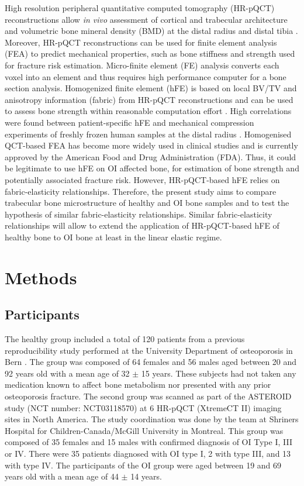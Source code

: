 \documentclass[a4paper,fleqn]{DC_ArtStyle}
\begin{document}
	High resolution peripheral quantitative computed tomography (HR-pQCT) reconstructions allow \textit{in vivo} assessment of cortical and trabecular architecture and volumetric bone mineral density (BMD) at the distal radius and distal tibia \cite{Boutroy2005}. Moreover, HR-pQCT reconstructions can be used for finite element analysis (FEA) to predict mechanical properties, such as bone stiffness and strength \cite{Boutroy2008} used for fracture risk estimation. Micro-finite element (\si{\micro}FE) analysis converts each voxel into an element and thus requires high performance computer for a bone section analysis. Homogenized finite element (hFE) is based on local BV/TV and anisotropy information (fabric) from HR-pQCT reconstructions and can be used to assess bone strength within reasonable computation effort \cite{Pahr2009}. High correlations were found between patient-specific hFE and mechanical compression experiments of freshly frozen human samples at the distal radius \cite{Varga2011,Hosseini2017,AriasMoreno2019}. Homogenised QCT-based FEA has become more widely used in clinical studies \cite{VanDenBergh2021} and is currently approved by the American Food and Drug Administration (FDA). Thus, it could be legitimate to use hFE on OI affected bone, for estimation of bone strength and potentially associated fracture risk. However, HR-pQCT-based hFE relies on fabric-elasticity relationships. Therefore, the present study aims to compare trabecular bone microstructure of healthy and OI bone samples and to test the hypothesis of similar fabric-elasticity relationships. Similar fabric-elasticity relationships will allow to extend the application of HR-pQCT-based hFE of healthy bone to OI bone at least in the linear elastic regime.
	
	
	\section{Methods}
	
	\subsection{Participants}
	The healthy group included a total of 120 patients from a previous reproducibility study performed at the University Department of osteoporosis in Bern \cite{Schenk2020}. The group was composed of 64 females and 56 males aged between 20 and 92 years old with a mean age of 32 $\pm$ 15 years. These subjects had not taken any medication known to affect bone metabolism nor presented with any prior osteoporosis fracture. The second group was scanned as part of the ASTEROID study (NCT number: NCT03118570) at 6 HR-pQCT (XtremeCT II) imaging sites in North America. The study coordination was done by the team at Shriners Hospital for Children-Canada/McGill University in Montreal. This group was composed of 35 females and 15 males with confirmed diagnosis of OI Type I, III or IV. There were 35 patients diagnosed with OI type I, 2 with type III, and 13 with type IV. The participants of the OI group were aged between 19 and 69 years old with a mean age of 44 $\pm$ 14 years.
	
\end{document}
